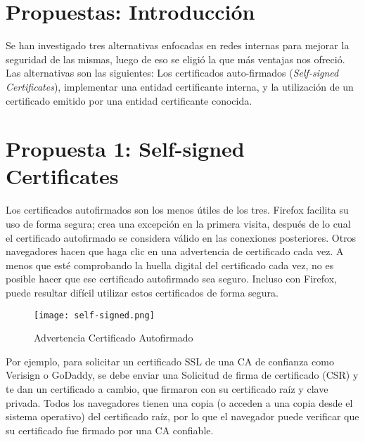 
\section{Propuestas: Introducción}

Se han investigado tres alternativas enfocadas en redes internas para mejorar la seguridad de las 
mismas, luego de eso se eligió la que más ventajas nos ofreció.
Las alternativas son las siguientes: Los certificados auto-firmados (\emph{Self-signed Certificates}), implementar
una entidad certificante interna, y la utilización de un certificado emitido por una entidad
certificante conocida.

\section{Propuesta 1: Self-signed Certificates}
Los certificados autofirmados son los menos útiles de los tres. Firefox facilita su uso 
de forma segura; crea una excepción en la primera visita, después de lo cual el 
certificado autofirmado se considera válido en las conexiones posteriores. Otros 
navegadores hacen que haga clic en una advertencia de certificado cada vez. A menos 
que esté comprobando la huella digital del certificado cada vez, no es posible hacer 
que ese certificado autofirmado sea seguro. Incluso con Firefox, puede resultar 
difícil utilizar estos certificados de forma segura.

\begin{center}
   \begin{figure}   
      \begin{center}
         \texttt{[image: self-signed.png]}
      \end{center}
      \caption{Advertencia Certificado Autofirmado}
   \end{figure}
\end{center}

Por ejemplo, para solicitar un certificado SSL de una CA de confianza como Verisign o 
GoDaddy, se debe enviar una Solicitud de firma de certificado (CSR) y te dan un 
certificado a cambio, que firmaron con su certificado raíz y clave privada. Todos 
los navegadores tienen una copia (o acceden a una copia desde el sistema operativo) 
del certificado raíz, por lo que el navegador puede verificar que su certificado 
fue firmado por una CA confiable.

